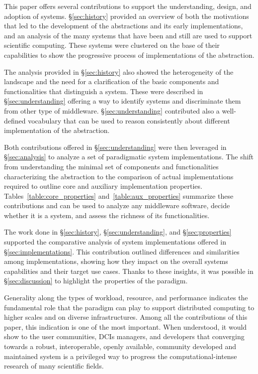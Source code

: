 \documentclass{sig-alternate}
\begin{document}
This paper offers several contributions to support the understanding, design,
and adoption of \pilot systems. \S\ref{sec:history} provided an overview of both
the motivations that led to the development of the \pilot abstractions and its
early implementations, and an analysis of the many \pilot systems that have been
and still are used to support scientific computing. These systems were clustered
on the base of their capabilities to show the progressive process of
implementations of the \pilot abstraction.

The analysis provided in \S\ref{sec:history} also showed the heterogeneity of
the \pilot landscape and the need for a clarification of the basic components
and functionalities that distinguish a \pilot system. These were described in
\S\ref{sec:understanding} offering a way to identify \pilot systems and
discriminate them from other type of middleware. \S\ref{sec:understanding}
contributed also a well-defined vocabulary that can be used to reason
consistently about different implementation of the \pilot abstraction.

Both contributions offered in \S\ref{sec:understanding} were then leveraged in
\S\ref{sec:analysis} to analyze a set of paradigmatic \pilot system
implementations. The shift from understanding the minimal set of components and
functionalities characterizing the \pilot abstraction to the comparison of
actual \pilot implementations required to outline core and auxiliary
implementation properties. Tables~\ref{table:core_properties}
and~\ref{table:aux_properties} summarize these contributions and can be used to
analyze any middleware software, decide whether it is a \pilot system, and
assess the richness of its functionalities.

The work done in \S\ref{sec:history}, \S\ref{sec:understanding}, and
\S\ref{sec:properties} supported the comparative analysis of \pilot system
implementations offered in \S\ref{sec:implementations}. This contribution
outlined differences and similarities among implementations, showing how they
impact on the overall \pilot systems capabilities and their target use cases.
Thanks to these insights, it was possible in \S\ref{sec:discussion} to highlight
the properties of the \pilot paradigm.

Generality along the types of workload, resource, and performance indicates the
fundamental role that the \pilot paradigm can play to support distributed
computing to higher scales and on diverse infrastructures. Among all the
contributions of this paper, this indication is one of the most important. When
understood, it would show to the user communities, DCIs managers, and developers
that converging towards a robust, interoperable, openly available, community
developed and maintained \pilot system is a privileged way to progress the
computational-intense research of many scientific fields.
\end{document}
